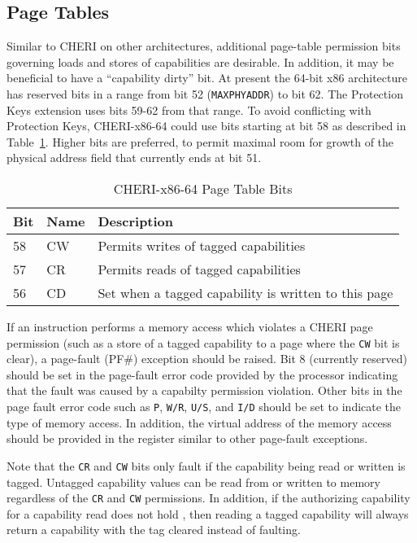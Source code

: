 \subsection{Page Tables}

Similar to CHERI on other architectures, additional page-table
permission bits governing loads and stores of capabilities are
desirable.  In addition, it may be beneficial to have a ``capability
dirty'' bit.  At present the 64-bit x86 architecture has reserved bits
in a range from bit 52 (\texttt{MAXPHYADDR}) to bit 62.  The Protection Keys
extension uses bits 59-62 from that range.  To avoid conflicting with
Protection Keys, CHERI-x86-64 could use bits starting at bit 58 as described in Table~\ref{table:x86:pte}.  Higher bits are
preferred, to permit maximal room for growth of the physical address
field that currently ends at bit 51.

\begin{table}
\begin{center}
\begin{tabular}{lll}
\toprule
Bit & Name & Description \\
\midrule
58 & CW & Permits writes of tagged capabilities \\
57 & CR & Permits reads of tagged capabilities \\
56 & CD & Set when a tagged capability is written to this page \\
\bottomrule
\end{tabular}
\end{center}
\caption{CHERI-x86-64 Page Table Bits}
\label{table:x86:pte}
\end{table}

If an instruction performs a memory access which violates a CHERI page
permission (such as a store of a tagged capability to a page where the
\texttt{CW} bit is clear), a page-fault (PF\#) exception should be
raised.  Bit 8 (currently reserved) should be set in the page-fault
error code provided by the processor indicating that the fault was
caused by a capabilty permission violation.  Other bits in the page
fault error code such as \texttt{P}, \texttt{W/R}, \texttt{U/S}, and
\texttt{I/D} should be set to indicate the type of memory access.  In
addition, the virtual address of the memory access should be provided
in the \CRTWO{} register similar to other page-fault exceptions.

Note that the \texttt{CR} and \texttt{CW} bits only fault if the
capability being read or written is tagged.  Untagged capability
values can be read from or written to memory regardless of the
\texttt{CR} and \texttt{CW} permissions.  In addition, if the
authorizing capability for a capability read does not hold \cappermLC,
then reading a tagged capability will always return a capability with
the tag cleared instead of faulting.

